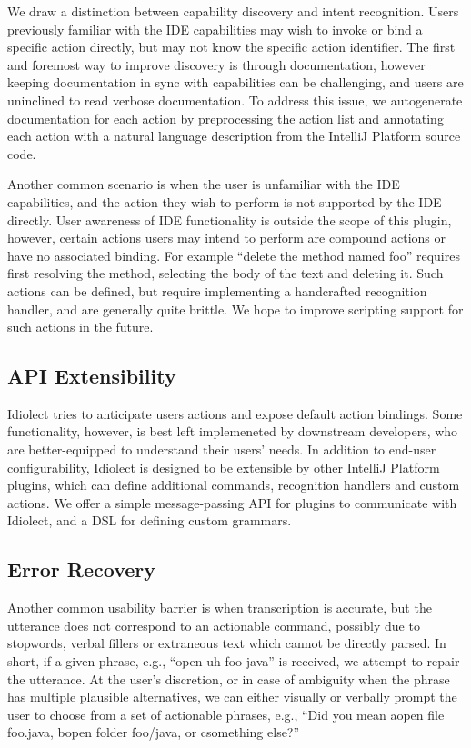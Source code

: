 \documentclass[conference]{IEEEtran}
\begin{document}
We draw a distinction between capability discovery and intent recognition. Users previously familiar with the IDE capabilities may wish to invoke or bind a specific action directly, but may not know the specific action identifier. The first and foremost way to improve discovery is through documentation, however keeping documentation in sync with capabilities can be challenging, and users are uninclined to read verbose documentation. To address this issue, we autogenerate documentation for each action by preprocessing the action list and annotating each action with a natural language description from the IntelliJ Platform source code.

Another common scenario is when the user is unfamiliar with the IDE capabilities, and the action they wish to perform is not supported by the IDE directly. User awareness of IDE functionality is outside the scope of this plugin, however, certain actions users may intend to perform are compound actions or have no associated binding. For example ``delete the method named \textlangle foo\textrangle'' requires first resolving the method, selecting the body of the text and deleting it. Such actions can be defined, but require implementing a handcrafted recognition handler, and are generally quite brittle. We hope to improve scripting support for such actions in the future.

\subsection{API Extensibility}

Idiolect tries to anticipate users actions and expose default action bindings. Some functionality, however, is best left implemeneted by downstream developers, who are better-equipped to understand their users' needs. In addition to end-user configurability, Idiolect is designed to be extensible by other IntelliJ Platform plugins, which can define additional commands, recognition handlers and custom actions. We offer a simple message-passing API for plugins to communicate with Idiolect, and a DSL for defining custom grammars.

\subsection{Error Recovery}\label{sec:error}

Another common usability barrier is when transcription is accurate, but the utterance does not correspond to an actionable command, possibly due to stopwords, verbal fillers or extraneous text which cannot be directly parsed. In short, if a given phrase, e.g., ``open uh foo java'' is received, we attempt to repair the utterance. At the user's discretion, or in case of ambiguity when the phrase has multiple plausible alternatives, we can either visually or verbally prompt the user to choose from a set of actionable phrases, e.g., ``Did you mean \textlangle a\textrangle open file foo.java, \textlangle b\textrangle open folder foo/java, or \textlangle c\textrangle something else?''
\end{document}
